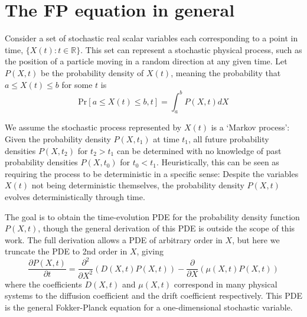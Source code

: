 \section{The FP equation in general}\label{sec:nuc_fopl_general}

Consider a set of stochastic real scalar variables each corresponding to a point in time, $\{X(t) : t \in \mathbb{R} \}$. This set can represent a stochastic physical process, such as the position of a particle moving in a random direction at any given time. Let $P(X,t)$ be the probability density of $X(t)$, meaning the probability that $a\leq X(t) \leq b$ for some $t$ is
\begin{equation}
\mathrm{Pr}[a\leq X(t) \leq b,t]=\int_a^b P(X,t)dX
\end{equation}

We assume the stochastic process represented by $X(t)$ is a `Markov process': Given the probability density $P(X,t_1)$ at time $t_1$, all future probability densities $P(X,t_2)$ for $t_2>t_1$ can be determined with no knowledge of past probability densities $P(X,t_0)$ for $t_0<t_1$. Heuristically, this can be seen as requiring the process to be deterministic in a specific sense: Despite the variables $X(t)$ not being deterministic themselves, the probability density $P(X,t)$ evolves deterministically through time.

The goal is to obtain the time-evolution PDE for the probability density function $P(X,t)$, though the general derivation \cite{kolpas07,gardiner_stochastic} of this PDE is outside the scope of this work. The full derivation allows a PDE of arbitrary order in $X$, but here we truncate the PDE to 2nd order in $X$, giving
\begin{equation}\label{eq:fopl_general}
\frac{\partial P(X,t)}{\partial t}= \frac{\partial^2}{\partial X^2} (D(X,t)P(X,t)) -  \frac{\partial}{\partial X}(\mu(X,t)P(X,t))
\end{equation}
where the coefficients $D(X,t)$ and $\mu(X,t)$ correspond in many physical systems to the diffusion coefficient and the drift coefficient respectively. This PDE is the general Fokker-Planck equation for a one-dimensional stochastic variable.

